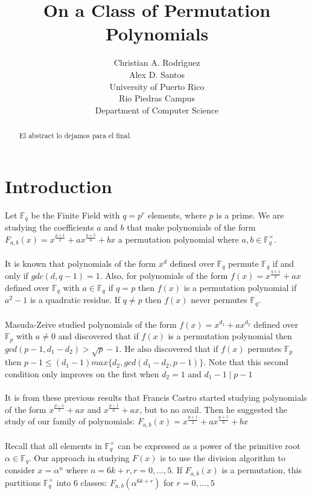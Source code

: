 \documentclass[12pt]{article}
\title{On a Class of Permutation Polynomials}
\author{Christian A. Rodr\'{\i}guez \\ Alex D. Santos \\ University of Puerto Rico \\ Rio Piedras Campus \\ Department of Computer Science}
\date{}
\begin{document}
\maketitle

\begin{abstract}

El abstract lo dejamos para el final.

\end{abstract}

\section{Introduction}\label{intro}

Let $\mathbb{F}_{q}$ be the Finite Field with $q=p^{r}$ elements, where $p$ is a prime. We are studying the coefficients $a$ and $b$ that make polynomials of the form $F_{a,b}(x)=x^{\frac{p+1}{2}} + ax^{\frac{p+5}{6}} + bx$ a permutation polynomial where $a,b \in \mathbb{F}_{q}^{\times}$. \\
\\
It is known that polynomials of the form $x^{d}$ defined over $\mathbb{F}_{q}$ permute $\mathbb{F}_{q}$ if and only if $gdc(d,q-1)=1$. Also, for polynomials of the form $f(x)=x^{\frac{q+1}{2}}+ax$ defined over $\mathbb{F}_{q}$ with $a \in \mathbb{F}_{q}$ if $q=p$ then $f(x)$ is a permutation polynomial if $a^{2}-1$ is a quadratic residue. If $q\neq p$ then $f(x)$ never permutes $\mathbb{F}_{q}$.\\
\\
Masuda-Zeive studied polynomials of the form $f(x)=x^{d_{1}}+ax^{d_{2}}$ defined over $\mathbb{F}_{p}$ with $a\neq 0$ and discovered that if $f(x)$ is a permutation polynomial then $gcd(p-1,d_{1}-d_{2})>\sqrt{p}-1$. He also discovered that if $f(x)$ permutes $\mathbb{F}_{p}$ then $p-1\leq (d_{1}-1)max\lbrace d_{2},gcd(d_{1}-d_{2},p-1) \rbrace$. Note that this second condition only improves on the first when $d_{2}=1$ and $d_{1}-1 \mid p-1$ \\
\\
It is from these previous results that Francis Castro started studying polynomials of the form $x^{\frac{p-1}{3}}+ax$ and $x^{\frac{p-1}{6}}+ax$, but to no avail. Then he suggested the study of our family of polynomials: $F_{a,b}(x)=x^{\frac{p+1}{2}} + ax^{\frac{p+5}{6}} + bx$ \\
\\
Recall that all elements in $\mathbb{F}_{q}^{\times}$ can be expressed as a power of the primitive root $\alpha \in \mathbb{F}_{q}$. Our approach in studying $F(x)$ is to use the division algorithm to consider $x=\alpha^{n}$ where $n=6k+r, r=0,...,5$. If $F_{a,b}(x)$ is a permutation, this partitions $\mathbb{F}_{q}^{\times}$ into 6 classes: $F_{a,b}(\alpha^{6k+r})$ for $r=0,...,5$
\end{document}

